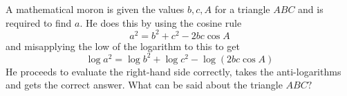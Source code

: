 \documentclass{pset}
\begin{document}
\begin{problems}
\begin{problem}[IrMO 1988 Q4]
    A mathematical moron is given the values \(b, c, A\) for a triangle \(A B C\) and is required to find \(a .\) He does this by using the cosine rule
    $$
    a^{2}=b^{2}+c^{2}-2 b c \cos A
    $$
    and misapplying the low of the logarithm to this to get
    $$
    \log a^{2}=\log b^{2}+\log c^{2}-\log (2 b c \cos A)
    $$
    He proceeds to evaluate the right-hand side correctly, takes the anti-logarithms and gets the correct answer. What can be said about the triangle \(A B C ?\)
\end{problem}


\end{problems}
\end{document}
